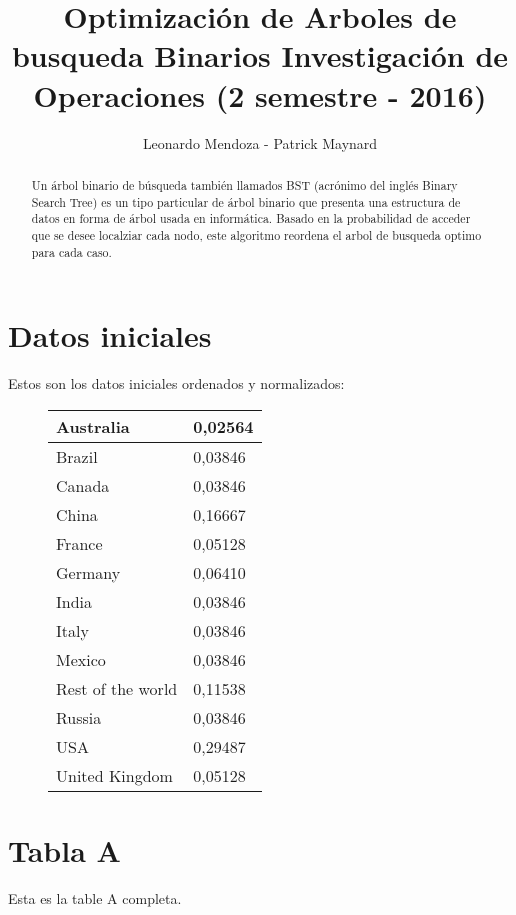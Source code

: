 \documentclass{article}
\begin{document}
\title{Optimización de Arboles de busqueda Binarios Investigación de Operaciones  (2 semestre - 2016)}
\author{Leonardo Mendoza - Patrick Maynard}

\maketitle

\begin{abstract}
Un árbol binario de búsqueda también llamados BST (acrónimo del inglés Binary Search Tree) es un tipo particular de árbol binario que presenta una estructura de datos en forma de árbol usada en informática. Basado en la probabilidad de acceder que se desee localziar cada nodo, este algoritmo reordena el arbol de busqueda optimo para cada caso. 
\end{abstract}

\section{Datos iniciales}

Estos son los datos iniciales ordenados y normalizados: 

\centering 
\begin{figure}[H]
\label{my-label2}
\begin{tabular}{|l|l|} 
 \hline Australia & 0,02564 \\ \hline
 Brazil & 0,03846 \\ \hline
 Canada & 0,03846 \\ \hline
 China & 0,16667 \\ \hline
 France & 0,05128 \\ \hline
 Germany & 0,06410 \\ \hline
 India & 0,03846 \\ \hline
 Italy & 0,03846 \\ \hline
 Mexico & 0,03846 \\ \hline
 Rest of the world & 0,11538 \\ \hline
 Russia & 0,03846 \\ \hline
 USA & 0,29487 \\ \hline
 United Kingdom & 0,05128 \\ \hline
\end{tabular}
\end{figure}
    
\section{Tabla A}
Esta es la table A completa.
\end{document}
